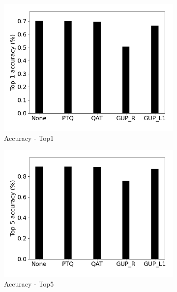 \begin{figure}[]
    \centering
    \begin{subfigure}{0.19\textwidth}
        \includegraphics[width=1\textwidth]{other/figures/Resnet18_ImageNet1k_PC/TOP1accuracy.png}
        \caption{Accuracy - Top1}
    \end{subfigure}
    \begin{subfigure}{0.19\textwidth}
        \includegraphics[width=1\textwidth]{other/figures/Resnet18_ImageNet1k_PC/TOP5accuracy.png}
        \caption{Accuracy - Top5}
    \end{subfigure}
    \begin{subfigure}{0.19\textwidth}

\end{subfigure}
\end{figure}
